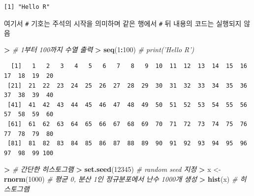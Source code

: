 \documentclass[11pt,a4paper]{book}
\newenvironment{Shaded}{\begin{snugshade}}{\end{snugshade}}
\newcommand{\KeywordTok}[1]{\textcolor[rgb]{0.13,0.29,0.53}{\textbf{#1}}}
\newcommand{\DecValTok}[1]{\textcolor[rgb]{0.00,0.00,0.81}{#1}}
\newcommand{\StringTok}[1]{\textcolor[rgb]{0.31,0.60,0.02}{#1}}
\newcommand{\CommentTok}[1]{\textcolor[rgb]{0.56,0.35,0.01}{\textit{#1}}}
\newcommand{\OperatorTok}[1]{\textcolor[rgb]{0.81,0.36,0.00}{\textbf{#1}}}
\newcommand{\ErrorTok}[1]{\textcolor[rgb]{0.64,0.00,0.00}{\textbf{#1}}}
\newcommand{\NormalTok}[1]{#1}
\theoremstyle{definition}
\theoremstyle{definition}
\theoremstyle{definition}
\theoremstyle{remark}
\begin{document}
\begin{verbatim}
[1] "Hello R"
\end{verbatim}

\normalsize

여기서 \texttt{\#} 기호는 주석의 시작을 의미하며 같은 행에서 \texttt{\#}
뒤 내용의 코드는 실행되지 않음

\footnotesize

\begin{Shaded}
\begin{Highlighting}[]
\OperatorTok{>}\StringTok{ }\CommentTok{# 1부터 100까지 수열 출력}
\ErrorTok{>}\StringTok{ }\KeywordTok{seq}\NormalTok{(}\DecValTok{1}\OperatorTok{:}\DecValTok{100}\NormalTok{)  }\CommentTok{# print('Hello R')}
\end{Highlighting}
\end{Shaded}

\begin{verbatim}
  [1]   1   2   3   4   5   6   7   8   9  10  11  12  13  14  15  16  17  18  19  20
 [21]  21  22  23  24  25  26  27  28  29  30  31  32  33  34  35  36  37  38  39  40
 [41]  41  42  43  44  45  46  47  48  49  50  51  52  53  54  55  56  57  58  59  60
 [61]  61  62  63  64  65  66  67  68  69  70  71  72  73  74  75  76  77  78  79  80
 [81]  81  82  83  84  85  86  87  88  89  90  91  92  93  94  95  96  97  98  99 100
\end{verbatim}

\normalsize

\footnotesize

\begin{Shaded}
\begin{Highlighting}[]
\OperatorTok{>}\StringTok{ }\CommentTok{# 간단한 히스토그램}
\ErrorTok{>}\StringTok{ }\KeywordTok{set.seed}\NormalTok{(}\DecValTok{12345}\NormalTok{)  }\CommentTok{# random seed 지정}
\OperatorTok{>}\StringTok{ }\NormalTok{x <-}\StringTok{ }\KeywordTok{rnorm}\NormalTok{(}\DecValTok{1000}\NormalTok{)  }\CommentTok{# 평균 0, 분산 1인 정규분포에서 난수 1000개 생성}
\OperatorTok{>}\StringTok{ }\KeywordTok{hist}\NormalTok{(x)  }\CommentTok{# 히스토그램}
\end{Highlighting}
\end{Shaded}
\end{document}
